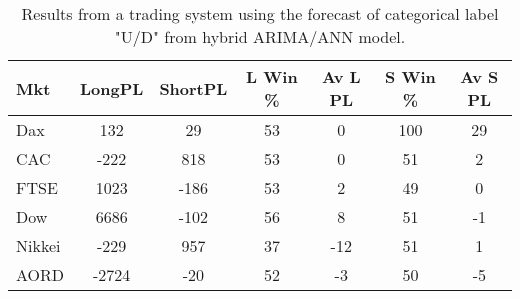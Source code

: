 \begin{table}[ht]
\centering
\caption[Results from a trading system using the forecast of categorical label "U/D" from hybrid ARIMA/ANN model]{Results from a trading system using the forecast of categorical label "U/D" from hybrid ARIMA/ANN model.} 
\label{tab:chp_ts:pUD_CAT_arima_ann_sys}
\begin{tabular}{lcccccc}
  \toprule Mkt & LongPL & ShortPL & L Win \% & Av L PL & S Win \% & Av S PL \\ 
  \midrule Dax & 132 & 29 & 53 & 0 & 100 & 29 \\ 
  CAC & -222 & 818 & 53 & 0 & 51 & 2 \\ 
  FTSE & 1023 & -186 & 53 & 2 & 49 & 0 \\ 
  Dow & 6686 & -102 & 56 & 8 & 51 & -1 \\ 
  Nikkei & -229 & 957 & 37 & -12 & 51 & 1 \\ 
  AORD & -2724 & -20 & 52 & -3 & 50 & -5 \\ 
   \bottomrule \end{tabular}
\end{table}
